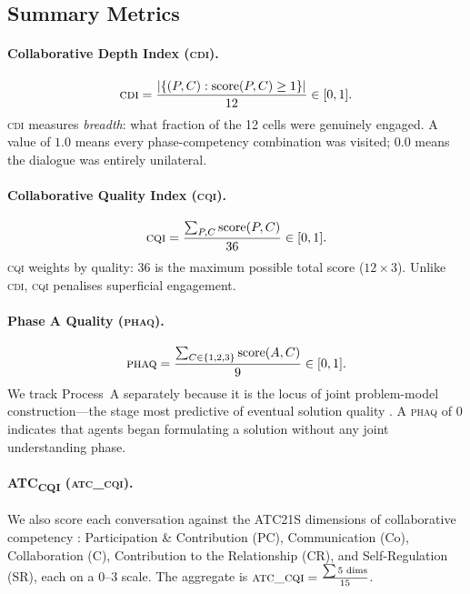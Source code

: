 \documentclass{article}
\newcommand{\CDI}{\textsc{cdi}}
\newcommand{\CQI}{\textsc{cqi}}
\newcommand{\PhAQ}{\textsc{phaq}}
\newcommand{\ATC}{\textsc{atc\_cqi}}
\begin{document}
\subsection{Summary Metrics}

\paragraph{Collaborative Depth Index (\CDI).}
\begin{equation}
  \CDI = \frac{|\{(P,C) : \text{score}(P,C) \geq 1\}|}{12} \in [0, 1].
\end{equation}
\CDI{} measures \emph{breadth}: what fraction of the 12 cells were
genuinely engaged. A value of $1.0$ means every phase-competency
combination was visited; $0.0$ means the dialogue was entirely
unilateral.

\paragraph{Collaborative Quality Index (\CQI).}
\begin{equation}
  \CQI = \frac{\sum_{P,C} \text{score}(P,C)}{36} \in [0, 1].
\end{equation}
\CQI{} weights by quality: 36 is the maximum possible total score
($12 \times 3$). Unlike \CDI{}, \CQI{} penalises superficial
engagement.

\paragraph{Phase A Quality (\PhAQ).}
\begin{equation}
  \PhAQ = \frac{\sum_{C \in \{1,2,3\}} \text{score}(A, C)}{9} \in [0, 1].
\end{equation}
We track Process~A separately because it is the locus of joint
problem-model construction---the stage most predictive of eventual
solution quality \citep{chi2001learning}. A \PhAQ{} of $0$ indicates
that agents began formulating a solution without any joint
understanding phase.

\paragraph{ATC\textsubscript{CQI} (\ATC).}
We also score each conversation against the ATC21S dimensions of
collaborative competency \citep{griffin2012assessment}: Participation
\& Contribution (PC), Communication (Co), Collaboration (C),
Contribution to the Relationship (CR), and Self-Regulation (SR), each
on a 0--3 scale. The aggregate is $\ATC = \frac{\sum 5\text{ dims}}{15}$.
\end{document}

